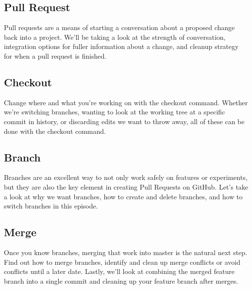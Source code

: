 
\subsection{Pull Request}\label{pull-request}

Pull requests are a means of starting a conversation about a proposed
change back into a project. We'll be taking a look at the strength of
conversation, integration options for fuller information about a change,
and cleanup strategy for when a pull request is finished.


\subsection{Checkout}\label{checkout}

Change where and what you're working on with the checkout command.
Whether we're switching branches, wanting to look at the working tree at
a specific commit in history, or discarding edits we want to throw away,
all of these can be done with the checkout command.


\subsection{Branch}\label{branch}

Branches are an excellent way to not only work safely on features or
experiments, but they are also the key element in creating Pull Requests
on GitHub. Let's take a look at why we want branches, how to create and
delete branches, and how to switch branches in this episode.


\subsection{Merge}\label{merge}

Once you know branches, merging that work into master is the natural
next step. Find out how to merge branches, identify and clean up merge
conflicts or avoid conflicts until a later date. Lastly, we'll look at
combining the merged feature branch into a single commit and cleaning up
your feature branch after merges.

